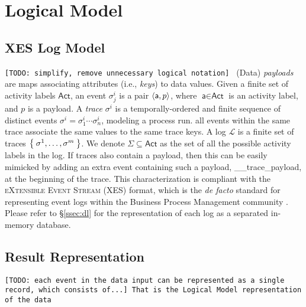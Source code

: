 \section{Logical Model}
\subsection{XES Log Model}\label{sec:XES}

\texttt{\color{red}[TODO: simplify, remove unnecessary logical notation] } (Data) \textit{payloads} are maps  associating attributes (i.e., \textit{keys}) to data values. %
Given a finite set of activity labels $\textsf{Act}$, an event $\sigma_j^{i}$ is a pair $\Braket{\textsf{a},p}$, where $\textsf{a}\in\textsf{Act}$ is an activity label, and $p$ is a payload. %
A \textit{trace} $\sigma^i$ is a temporally-ordered and finite sequence of distinct events $\sigma^i=\sigma_1^i\cdots\sigma_n^i$, modeling a process run. %
all events within the same trace associate the same values to the same trace keys. %
A log $\mathcal{L}$ is a finite set of traces $\Set{\sigma^1,\dots,\sigma^m}$. We denote  $\Sigma\subseteq\textsf{Act}$ as the set of all the possible activity labels in the log. If traces also contain a payload, then this can be easily mimicked by adding an extra event containing such a payload, \textsf{\_\_trace\_payload}, at the beginning of the trace. This  characterization \cite{bpm21} is compliant with the \textsc{eXtensible Event Stream} (XES) format, which is the \textit{de facto} standard for representing event logs within the Business Process Management community \cite{XES}. Please refer to \S\ref{ssec:dl} for the representation of each log as a separated in-memory database.

\subsection{Result Representation}
\texttt{\color{red}[TODO: each event in the data input can be represented as a single record, which consists of...] That is the Logical Model representation of the data}


